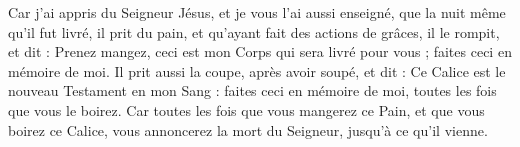 Car j’ai appris du Seigneur Jésus, et je vous l’ai aussi enseigné, que la nuit même qu’il fut livré, il prit du pain, et qu’ayant fait des actions de grâces, il le rompit, et dit : Prenez mangez, ceci est mon Corps qui sera livré pour vous ; faites ceci en mémoire de moi.
Il prit aussi la coupe, après avoir soupé, et dit : Ce Calice est le nouveau Testament en mon Sang : faites ceci en mémoire de moi, toutes les fois que vous le boirez.
Car toutes les fois que vous mangerez ce Pain, et que vous boirez ce Calice, vous annoncerez la mort du Seigneur, jusqu’à ce qu’il vienne.